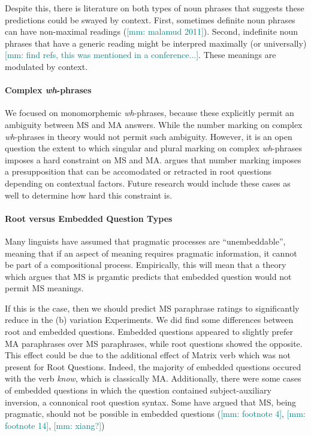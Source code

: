 \documentclass[12pt,letterpaper,table,svgnames,dvipsnames]{article}
\newcommand{\mm}[1]{\textcolor{teal}{[mm: #1]}}
\begin{document}
Despite this, there is literature on both types of noun phrases that suggests these predictions could be swayed by context. First, sometimes definite noun phrases can have non-maximal readings (\mm{malamud 2011}). Second, indefinite noun phrases that have a generic reading might be interpred maximally (or universally) \mm{find refs, this was mentioned in a conference...}. These meanings are modulated by context.



\paragraph{Complex \emph{wh}-phrases}
We focused on monomorphemic \emph{wh}-phrases, because these explicitly permit an ambiguity between MS and MA answers. While the number marking on complex \emph{wh}-phrases in theory would not permit such ambiguity. However, it is an open question the extent to which singular and plural marking on complex \emph{wh}-phrases imposes a hard constraint on MS and MA.  argues that number marking imposes a presupposition that can be accomodated or retracted in root questions depending on contextual factors. Future research would include these cases as well to determine how hard this constraint is.

\paragraph{Root versus Embedded Question Types}

Many linguists have assumed that pragmatic processes are ``unembeddable'', meaning that if an aspect of meaning requires pragmatic information, it cannot be part of a compositional process. Empirically, this will mean that a theory which argues that MS is prgamtic predicts that embedded question would not permit MS meanings. 

If this is the case, then we should predict MS paraphrase ratings to significantly reduce in the (b) variation Experiments. We did find some differences between root and embedded questions. Embedded questions appeared to slightly prefer MA paraphrases over MS paraphrases, while root questions showed the opposite. This effect could be due to the additional effect of Matrix verb which was not present for Root Questions. Indeed, the majority of embedded questions occured with the verb \emph{know}, which is classically MA. Additionally, there were some cases of embedded questions in which the question contained subject-auxiliary inversion, a connonical root question syntax. Some have argued that MS, being pragmatic, should not be possible in embedded questions (\cite{karttunen1977}\mm{footnote 4}, \cite{groenstok1984}\mm{footnote 14}, \mm{xiang?})
\end{document}
